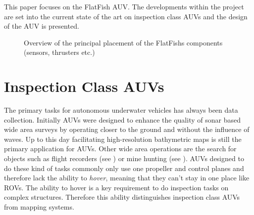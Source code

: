 \documentclass[conference]{IEEEtran}
\begin{document}
This paper focuses on the FlatFish AUV. The developments within the project are set into the current state of the art on inspection class AUVs and the design of the AUV is presented.


\begin{figure}[!t]
	\begin{center}
		\centering
		\hfil
		\caption{Overview of the principal placement of the FlatFishs components (sensors, thrusters etc.)}
		\label{fig:sensor_placement}
	\end{center}
\end{figure}

\section{Inspection Class AUVs}

The primary tasks for autonomous underwater vehicles has always been data collection. Initially AUVs were designed to enhance the quality of sonar based wide area surveys by operating closer to the ground and without the influence of waves. Up to this day facilitating high-resolution bathymetric maps is still the primary application for AUVs. Other wide area operations are the search for objects such as flight recorders (see \cite{purcell2011}) or mine hunting (see \cite{Couillard2012}). AUVs designed to do these kind of tasks commonly only use one propeller and control planes and therefore lack the ability to \textit{hover}, meaning that they can't stay in one place like ROVs. The ability to hover is a key requirement to do inspection tasks on complex structures. Therefore this ability distinguishes inspection class AUVs from mapping systems.
\end{document}
